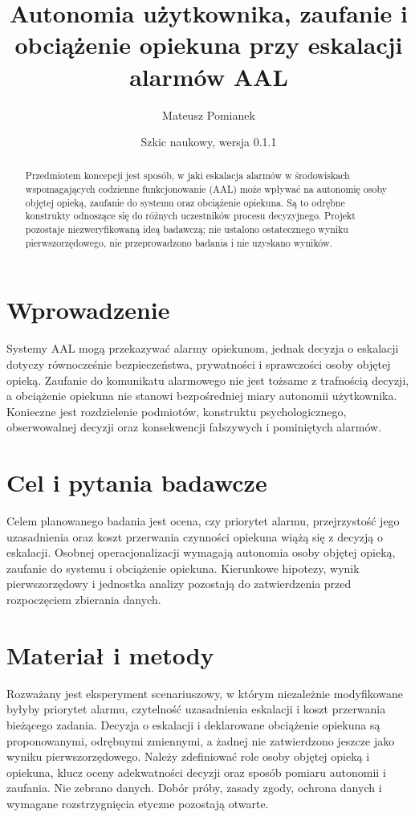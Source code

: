 \documentclass[11pt,a4paper]{article}
\title{Autonomia użytkownika, zaufanie i obciążenie opiekuna przy eskalacji alarmów AAL}
\author{Mateusz Pomianek}
\date{Szkic naukowy, wersja 0.1.1}
\begin{document}
\maketitle

\begin{abstract}

Przedmiotem koncepcji jest sposób, w jaki eskalacja alarmów w środowiskach wspomagających codzienne funkcjonowanie (AAL) może wpływać na autonomię osoby objętej opieką, zaufanie do systemu oraz obciążenie opiekuna. Są to odrębne konstrukty odnoszące się do różnych uczestników procesu decyzyjnego. Projekt pozostaje niezweryfikowaną ideą badawczą; nie ustalono ostatecznego wyniku pierwszorzędowego, nie przeprowadzono badania i nie uzyskano wyników.

\end{abstract}

\section{Wprowadzenie}

Systemy AAL mogą przekazywać alarmy opiekunom, jednak decyzja o eskalacji dotyczy równocześnie bezpieczeństwa, prywatności i sprawczości osoby objętej opieką. Zaufanie do komunikatu alarmowego nie jest tożsame z trafnością decyzji, a obciążenie opiekuna nie stanowi bezpośredniej miary autonomii użytkownika. Konieczne jest rozdzielenie podmiotów, konstruktu psychologicznego, obserwowalnej decyzji oraz konsekwencji fałszywych i pominiętych alarmów.

\section{Cel i pytania badawcze}

Celem planowanego badania jest ocena, czy priorytet alarmu, przejrzystość jego uzasadnienia oraz koszt przerwania czynności opiekuna wiążą się z decyzją o eskalacji. Osobnej operacjonalizacji wymagają autonomia osoby objętej opieką, zaufanie do systemu i obciążenie opiekuna. Kierunkowe hipotezy, wynik pierwszorzędowy i jednostka analizy pozostają do zatwierdzenia przed rozpoczęciem zbierania danych.

\section{Materiał i metody}

Rozważany jest eksperyment scenariuszowy, w którym niezależnie modyfikowane byłyby priorytet alarmu, czytelność uzasadnienia eskalacji i koszt przerwania bieżącego zadania. Decyzja o eskalacji i deklarowane obciążenie opiekuna są proponowanymi, odrębnymi zmiennymi, a żadnej nie zatwierdzono jeszcze jako wyniku pierwszorzędowego. Należy zdefiniować role osoby objętej opieką i opiekuna, klucz oceny adekwatności decyzji oraz sposób pomiaru autonomii i zaufania. Nie zebrano danych. Dobór próby, zasady zgody, ochrona danych i wymagane rozstrzygnięcia etyczne pozostają otwarte.
\end{document}
